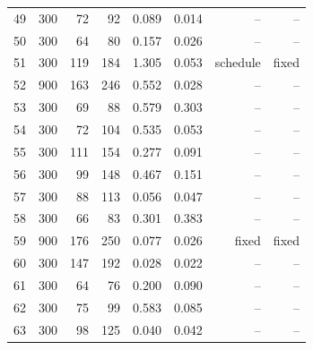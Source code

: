 \begin{longtable}{rrrrrrrr}
49 & 300 & 72 & 92 & 0.089 & 0.014 & -- & -- \\
50 & 300 & 64 & 80 & 0.157 & 0.026 & -- & -- \\
51 & 300 & 119 & 184 & 1.305 & 0.053 & schedule & fixed \\
52 & 900 & 163 & 246 & 0.552 & 0.028 & -- & -- \\
53 & 300 & 69 & 88 & 0.579 & 0.303 & -- & -- \\
54 & 300 & 72 & 104 & 0.535 & 0.053 & -- & -- \\
55 & 300 & 111 & 154 & 0.277 & 0.091 & -- & -- \\
56 & 300 & 99 & 148 & 0.467 & 0.151 & -- & -- \\
57 & 300 & 88 & 113 & 0.056 & 0.047 & -- & -- \\
58 & 300 & 66 & 83 & 0.301 & 0.383 & -- & -- \\
59 & 900 & 176 & 250 & 0.077 & 0.026 & fixed & fixed \\
60 & 300 & 147 & 192 & 0.028 & 0.022 & -- & -- \\
61 & 300 & 64 & 76 & 0.200 & 0.090 & -- & -- \\
62 & 300 & 75 & 99 & 0.583 & 0.085 & -- & -- \\
63 & 300 & 98 & 125 & 0.040 & 0.042 & -- & -- \\
\bottomrule
\end{longtable}
